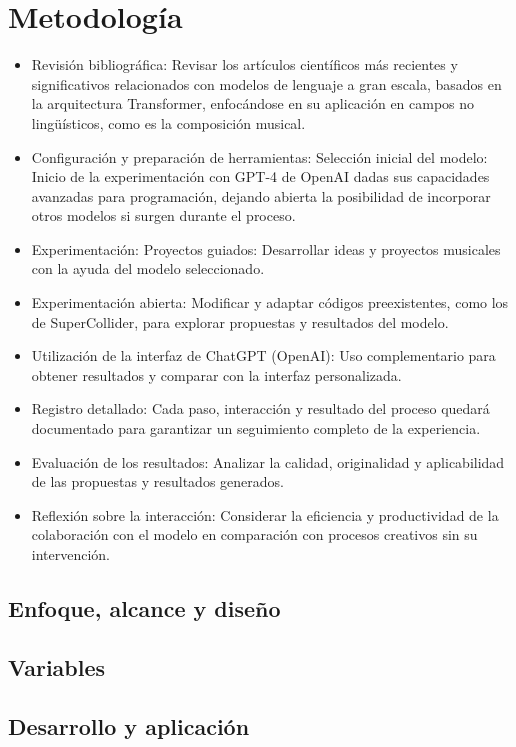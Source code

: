 \chapter{Metodología}

\begin{itemize}
    \item Revisión bibliográfica:
    Revisar los artículos científicos más recientes y significativos relacionados con modelos de lenguaje a gran escala, basados en la arquitectura Transformer, enfocándose en su aplicación en campos no lingüísticos, como es la composición musical.
    \item Configuración y preparación de herramientas:
    Selección inicial del modelo: Inicio de la experimentación con GPT-4 de OpenAI dadas sus capacidades avanzadas para programación, dejando abierta la posibilidad de incorporar otros modelos si surgen durante el proceso.
    \item Experimentación:
    Proyectos guiados: Desarrollar ideas y proyectos musicales con la ayuda del modelo seleccionado.
    \item Experimentación abierta:
    Modificar y adaptar códigos preexistentes, como los de SuperCollider, para explorar propuestas y resultados del modelo.
    \item Utilización de la interfaz de ChatGPT (OpenAI):
    Uso complementario para obtener resultados y comparar con la interfaz personalizada.
    \item Registro detallado:
    Cada paso, interacción y resultado del proceso quedará documentado para garantizar un seguimiento completo de la experiencia.
    \item Evaluación de los resultados:
    Analizar la calidad, originalidad y aplicabilidad de las propuestas y resultados generados.
    \item Reflexión sobre la interacción: Considerar la eficiencia y productividad de la colaboración con el modelo en comparación con procesos creativos sin su intervención.
\end{itemize}



\section{Enfoque, alcance y diseño}

\section{Variables}

\section{Desarrollo y aplicación}
